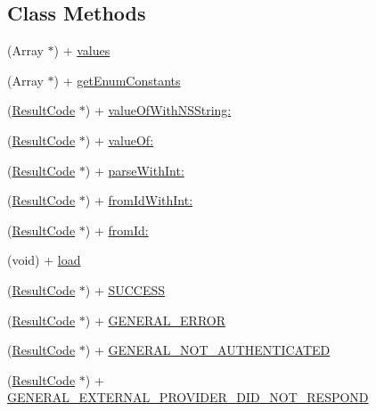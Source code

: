 \subsection*{Class Methods}
\begin{DoxyCompactItemize}
\item 
(Array $\ast$) + \hyperlink{interface_result_code_a1501b7afaafb7cfc3b3d4798de847081}{values}
\item 
(Array $\ast$) + \hyperlink{interface_result_code_a9802c9e92fcaefb94d29fa35af2f9967}{get\+Enum\+Constants}
\item 
(\hyperlink{interface_result_code}{Result\+Code} $\ast$) + \hyperlink{interface_result_code_ad5abb625236641812d0826f92b7b69f2}{value\+Of\+With\+N\+S\+String\+:}
\item 
(\hyperlink{interface_result_code}{Result\+Code} $\ast$) + \hyperlink{interface_result_code_a44a7d302062cad3a600d21a6ea1230ab}{value\+Of\+:}
\item 
(\hyperlink{interface_result_code}{Result\+Code} $\ast$) + \hyperlink{interface_result_code_ad64eb2d131038e9fea66a5d18e4a4454}{parse\+With\+Int\+:}
\item 
(\hyperlink{interface_result_code}{Result\+Code} $\ast$) + \hyperlink{interface_result_code_a0c317ed2c53be5e14ee15f3a3b34e836}{from\+Id\+With\+Int\+:}
\item 
(\hyperlink{interface_result_code}{Result\+Code} $\ast$) + \hyperlink{interface_result_code_af517a26ad1f911f34a42e28db47647dd}{from\+Id\+:}
\item 
(void) + \hyperlink{interface_result_code_aa2a697c8f2813ed3b7072e66a482007f}{load}
\item 
(\hyperlink{interface_result_code}{Result\+Code} $\ast$) + \hyperlink{interface_result_code_aec0ca0530fdf5b18b99302d79da3b0b4}{S\+U\+C\+C\+E\+S\+S}
\item 
(\hyperlink{interface_result_code}{Result\+Code} $\ast$) + \hyperlink{interface_result_code_af9fccdabde09681dd78b6dc76bec693b}{G\+E\+N\+E\+R\+A\+L\+\_\+\+E\+R\+R\+O\+R}
\item 
(\hyperlink{interface_result_code}{Result\+Code} $\ast$) + \hyperlink{interface_result_code_a335851bf28938c35baf74d0eb3c8837a}{G\+E\+N\+E\+R\+A\+L\+\_\+\+N\+O\+T\+\_\+\+A\+U\+T\+H\+E\+N\+T\+I\+C\+A\+T\+E\+D}
\item 
(\hyperlink{interface_result_code}{Result\+Code} $\ast$) + \hyperlink{interface_result_code_abe0ae2660ca82ba826bcf67f7d57a4a7}{G\+E\+N\+E\+R\+A\+L\+\_\+\+E\+X\+T\+E\+R\+N\+A\+L\+\_\+\+P\+R\+O\+V\+I\+D\+E\+R\+\_\+\+D\+I\+D\+\_\+\+N\+O\+T\+\_\+\+R\+E\+S\+P\+O\+N\+D}

\end{DoxyCompactItemize}
